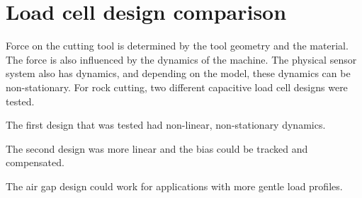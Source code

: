 \chapter{Load cell design comparison
\label{chap:load_cell_compare}}

Force on the cutting tool is determined by the tool geometry and the material.
The force is also influenced by the dynamics of the machine.
The physical sensor system also has dynamics, and depending on the model, 
these dynamics can be non-stationary.
For rock cutting, two different capacitive load cell designs were tested.

The first design that was tested had non-linear, non-stationary dynamics.

The second design was more linear and the bias could be tracked and compensated.

The air gap design could work for applications with more gentle load profiles.

